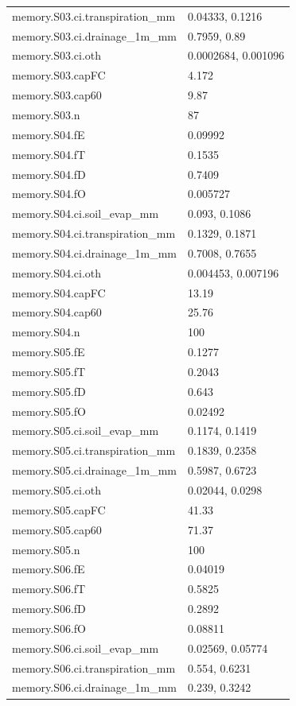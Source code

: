 {\begin{longtable}{p{}p{}}
{}memory.S03.ci.transpiration\_mm & 0.04333, 0.1216\\
{}memory.S03.ci.drainage\_1m\_mm & 0.7959, 0.89\\
{}memory.S03.ci.oth & 0.0002684, 0.001096\\
{}memory.S03.capFC & 4.172\\
{}memory.S03.cap60 & 9.87\\
{}memory.S03.n & 87\\
{}memory.S04.fE & 0.09992\\
{}memory.S04.fT & 0.1535\\
{}memory.S04.fD & 0.7409\\
{}memory.S04.fO & 0.005727\\
{}memory.S04.ci.soil\_evap\_mm & 0.093, 0.1086\\
{}memory.S04.ci.transpiration\_mm & 0.1329, 0.1871\\
{}memory.S04.ci.drainage\_1m\_mm & 0.7008, 0.7655\\
{}memory.S04.ci.oth & 0.004453, 0.007196\\
{}memory.S04.capFC & 13.19\\
{}memory.S04.cap60 & 25.76\\
{}memory.S04.n & 100\\
{}memory.S05.fE & 0.1277\\
{}memory.S05.fT & 0.2043\\
{}memory.S05.fD & 0.643\\
{}memory.S05.fO & 0.02492\\
{}memory.S05.ci.soil\_evap\_mm & 0.1174, 0.1419\\
{}memory.S05.ci.transpiration\_mm & 0.1839, 0.2358\\
{}memory.S05.ci.drainage\_1m\_mm & 0.5987, 0.6723\\
{}memory.S05.ci.oth & 0.02044, 0.0298\\
{}memory.S05.capFC & 41.33\\
{}memory.S05.cap60 & 71.37\\
{}memory.S05.n & 100\\
{}memory.S06.fE & 0.04019\\
{}memory.S06.fT & 0.5825\\
{}memory.S06.fD & 0.2892\\
{}memory.S06.fO & 0.08811\\
{}memory.S06.ci.soil\_evap\_mm & 0.02569, 0.05774\\
{}memory.S06.ci.transpiration\_mm & 0.554, 0.6231\\
{}memory.S06.ci.drainage\_1m\_mm & 0.239, 0.3242\\

\end{longtable}}

